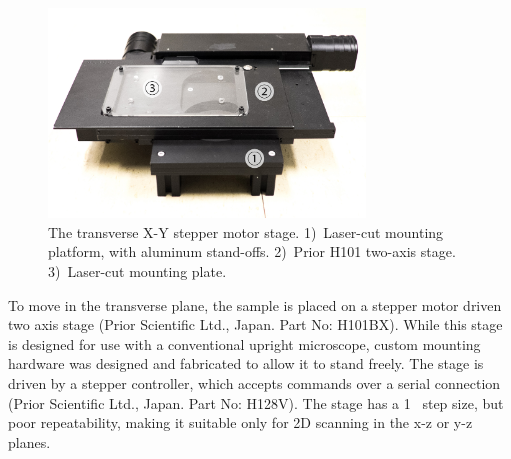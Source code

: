 \begin{figure}[h!]
\centering
\includegraphics[width=0.75\textwidth]{Images/Photographs/DSCF1722_an.jpg}
\caption[The transverse X-Y stepper motor stage.]{The transverse X-Y stepper motor stage. 1)~Laser-cut mounting platform, with aluminum stand-offs. 2)~Prior H101 two-axis stage. 3)~Laser-cut mounting plate.}
\end{figure}

To move in the transverse plane, the sample is placed on a stepper motor driven two axis stage (Prior Scientific Ltd., Japan. Part No: H101BX). While this stage is designed for use with a conventional upright microscope, custom mounting hardware was designed and fabricated to allow it to stand freely. The stage is driven by a stepper controller, which accepts commands over a serial connection (Prior Scientific Ltd., Japan. Part No: H128V). The stage has a 1 \micron~step size, but poor repeatability, making it suitable only for 2D scanning in the x-z or y-z planes.




